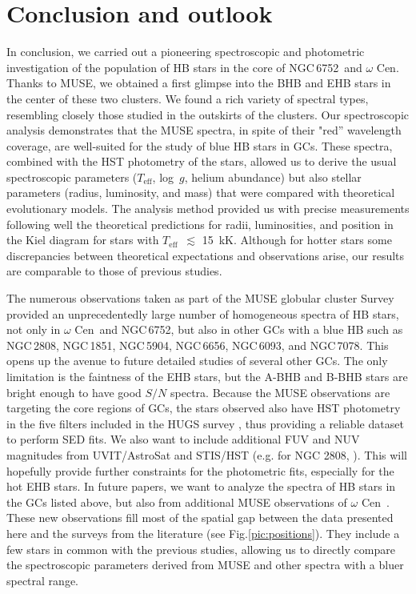 \documentclass{aa}
\newcommand{\teff}{$T_{\text{eff}}$}
\newcommand{\Cen}{$\omega$ Cen}
\newcommand{\ngc}{NGC\,6752}
\begin{document}
\section{Conclusion and outlook}\label{sec:conclusion}

 

In conclusion, we carried out a pioneering spectroscopic and photometric investigation of the population of HB stars in the core of \ngc\ and \Cen. Thanks to MUSE, we obtained a first glimpse into the BHB and EHB stars in the center of these two clusters. We found a rich variety of spectral types, resembling closely those studied in the outskirts of the clusters. Our spectroscopic analysis demonstrates
that the MUSE spectra, in spite of their "red'' wavelength coverage, are well-suited for the study of blue HB stars in GCs. These spectra, combined with the HST photometry of the stars, allowed us to derive the usual spectroscopic parameters (\teff, log~$g$, helium abundance) but also stellar parameters (radius, luminosity, and mass) that were compared with theoretical evolutionary models. The analysis method provided us with precise measurements following well the theoretical predictions for radii, luminosities, and position in the Kiel diagram for stars with \teff\ $\lesssim$ 15~kK. Although for hotter stars some discrepancies between theoretical expectations and observations arise, our results are comparable to those of previous studies.

The numerous observations taken as part of the MUSE globular cluster Survey provided an unprecedentedly large number of homogeneous spectra of HB stars, not only in \Cen\ and \ngc, but also in other GCs with a blue HB such as NGC\,2808, NGC\,1851, NGC\,5904, NGC\,6656, NGC\,6093, and NGC\,7078.
This opens up the avenue to future detailed studies of several other GCs. The only limitation is the faintness of the EHB stars, but the A-BHB and B-BHB stars are bright enough to have good $S/N$ spectra. Because the MUSE observations are targeting the core regions of GCs, the stars observed also have HST photometry in the five filters included in the HUGS survey \citep{nardiello2018,piotto2015}, thus providing a reliable dataset to perform SED fits. We
also want to include additional FUV and NUV magnitudes from
UVIT/AstroSat \citep{Sahu2022} and STIS/HST (e.g. for NGC 2808, \citealt{brown2001}). This will hopefully provide further constraints for the photometric fits, especially for the hot EHB stars.
In future papers, we want to analyze the spectra of HB stars in the GCs listed above, but also from additional MUSE observations of \Cen\ \citep{nitschai2023}. These new observations fill most of the spatial gap between the data presented here and the surveys from the literature (see Fig.\ref{pic:positions}). They include a few stars in common with the previous studies, allowing us to directly compare the spectroscopic parameters derived from MUSE and other spectra with a bluer spectral range. 
\end{document}
